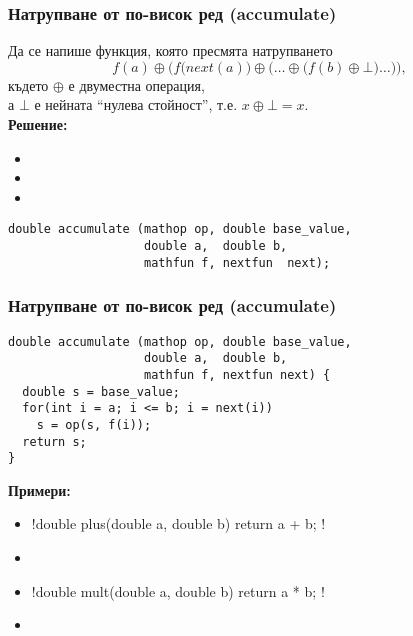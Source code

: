\documentclass{beamer}
\begin{document}
\begin{frame}[fragile]
  \frametitle{Натрупване от по-висок ред (accumulate)}
    Да се напише функция, която пресмята натрупването
  \begin{equation*}
    f(a) \oplus \bigg(f\big(next(a)\big) \oplus \Big(\ldots \oplus \big(f(b) \oplus \bot\big) \ldots\Big)\bigg),
  \end{equation*}
  където $\oplus$ е двуместна операция,\\
  а $\bot$ е нейната ``нулева стойност'', т.е. $x\oplus\bot = x$.\\[1em]
  \pause
  \textbf{Решение:}
  \begin{itemize}
  \item {}
  \item {}
  \item {}
  \end{itemize}
  \pause

\begin{lstlisting}
double accumulate (mathop op, double base_value,
                   double a,  double b,
                   mathfun f, nextfun  next);
\end{lstlisting}
\end{frame}

\begin{frame}[fragile]
  \frametitle{Натрупване от по-висок ред (accumulate)}
\begin{lstlisting}
double accumulate (mathop op, double base_value,
                   double a,  double b,
                   mathfun f, nextfun next) {
  double s = base_value;
  for(int i = a; i <= b; i = next(i))
    s = op(s, f(i));
  return s;
}
\end{lstlisting}
  \pause
  \textbf{Примери:}
  \small
  \begin{itemize}[<+->]
  \item \lst!double plus(double a, double b) { return a + b; }!
  \item {} \eqv {}
  \item \lst!double mult(double a, double b) { return a * b; }!
  \item {} \eqv {}
  \end{itemize}
\end{frame}
\end{document}
